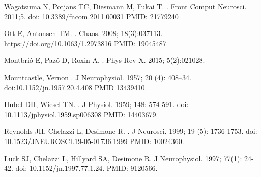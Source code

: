 \documentclass[10pt,letterpaper]{article}
\begin{document}
%
%
% 
\begin{thebibliography}{10}

Wagatsuma N, Potjans TC, Diesmann M, Fukai T.
.
\newblock Front Comput Neurosci. 2011;5. doi: 10.3389/fncom.2011.00031 PMID: 21779240

Ott E, Antonsen TM.
.
\newblock Chaos. 2008; 18(3):037113. https://doi.org/10.1063/1.2973816 PMID: 19045487

Montbrió E, Pazó D, Roxin A.
.
\newblock Phys Rev X. 2015; 5(2):021028.

Mountcastle, Vernon
.
\newblock J Neurophysiol. 1957; 20 (4): 408–34. doi:10.1152/jn.1957.20.4.408 PMID 13439410.

Hubel DH, Wiesel TN.
.
\newblock J Physiol. 1959; 148: 574-591. doi: 10.1113/jphysiol.1959.sp006308 PMID: 14403679.

Reynolds JH, Chelazzi L, Desimone R.
.
\newblock J Neurosci. 1999; 19 (5): 1736-1753. doi: 10.1523/JNEUROSCI.19-05-01736.1999 PMID: 10024360.

Luck SJ, Chelazzi L, Hillyard SA, Desimone R.
\newblock J Neurophysiol. 1997; 77(1): 24-42. doi: 10.1152/jn.1997.77.1.24. PMID: 9120566.


\end{thebibliography}
\end{document}
